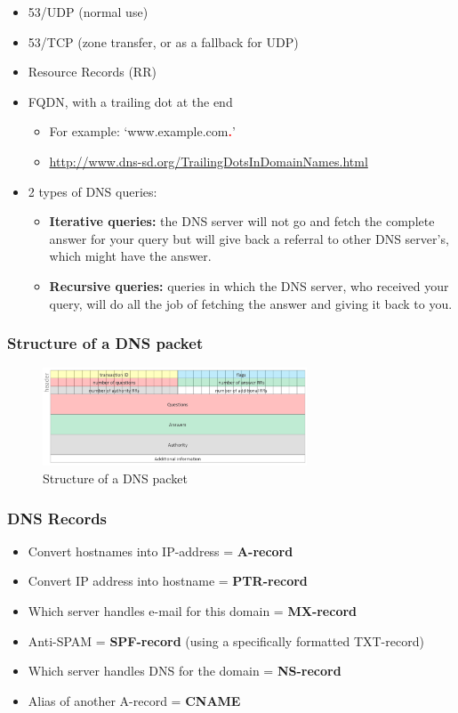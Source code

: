 \documentclass{article}
\begin{document}
\begin{itemize}
    \item 53/UDP (normal use)
    \item 53/TCP (zone transfer, or as a fallback for UDP)
    \item Resource Records (RR)
    \item FQDN, with a trailing dot at the end
    \begin{itemize}
        \item For example: `www.example.com\textbf{\textcolor{red}{.}}'
        \item \url{http://www.dns-sd.org/TrailingDotsInDomainNames.html}
    \end{itemize}
    \item 2 types of DNS queries:
    \begin{itemize}
        \item \textbf{Iterative queries:} the DNS server will not go and fetch the complete answer for your query but will give back a referral to other DNS server’s, which might have the answer.
        \item \textbf{Recursive queries:} queries in which the DNS server, who received your query, will do all the job of fetching the answer and giving it back to you.
    \end{itemize}
\end{itemize}

\subsubsection{Structure of a DNS packet}

\begin{figure}[H]
    \centering
    \includegraphics[width=0.7\textwidth]{dns-structure.png}
    \caption{Structure of a DNS packet}
\end{figure}

\subsubsection{DNS Records}

\begin{itemize}
    \item Convert hostnames into IP-address = \textbf{A-record}
    \item Convert IP address into hostname = \textbf{PTR-record}
    \item Which server handles e-mail for this domain = \textbf{MX-record}
    \item Anti-SPAM = \textbf{SPF-record} (using a specifically formatted TXT-record)
    \item Which server handles DNS for the domain = \textbf{NS-record}
    \item Alias of another A-record = \textbf{CNAME}
\end{itemize}
\end{document}
